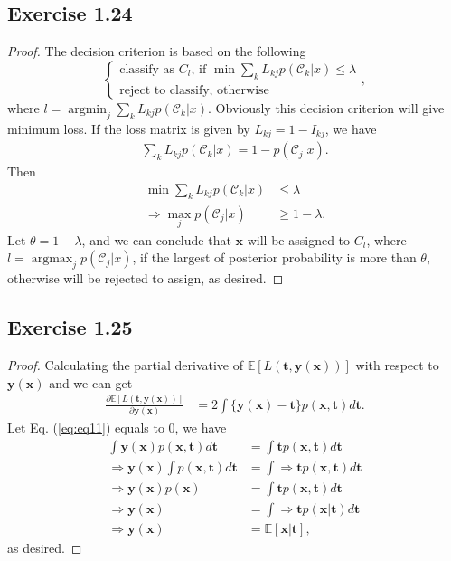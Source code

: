 \documentclass[11pt]{article}
\theoremstyle{definition}
\newcommand{\E}{\mathbb{E}}
\begin{document}
\subsection{Exercise 1.24}
\begin{proof}
The decision criterion is based on the following
$$\left\{\begin{array}{l}
\text{classify as } C_l \text{, if $\mathop{\min}\sum_k  L_{kj}p(\mathcal{C}_k|x)$} \leq \lambda\\ 
\text{reject to classify, otherwise}
\end{array}\right.,$$
where $l = \mathop{\arg\min}_j\sum_k  L_{kj}p(\mathcal{C}_k|x)$. Obviously this decision criterion will give minimum loss. If the loss matrix is given by $L_{kj} = 1 - I_{kj}$, we have
\begin{align*}
\sum_kL_{kj}p(\mathcal{C}_k|x) = 1 - p(\mathcal{C}_j|x).
\end{align*}
Then
\begin{align*}
\mathop{\min}\sum_k  L_{kj}p(\mathcal{C}_k|x) &\leq \lambda \\
\Rightarrow\mathop{\max}_j p(\mathcal{C}_j|x) &\geq 1 -\lambda.
\end{align*}
Let $\theta = 1 - \lambda$, and we can conclude that $\textbf{x}$ will be assigned to $C_l$, where $l = \mathop{\arg\max}_jp(\mathcal{C}_j|x)$, if the largest of posterior probability is more than $\theta$, otherwise will be rejected to assign, as desired.
\end{proof}

\subsection{Exercise 1.25}
\begin{proof}
Calculating the partial derivative of $\E[L(\textbf{t},\textbf{y}(\textbf{x}))]$ with respect to $\textbf{y}(\textbf{x})$ and we can get 
\begin{align}
\frac{\partial \E[L(\textbf{t},\textbf{y}(\textbf{x}))]}{\partial \textbf{y}(\textbf{x})} &= 2\int \{\textbf{y}(\textbf{x})-\textbf{t}\}p(\textbf{x},\textbf{t})d\textbf{t}.
\label{eq:eq11}
\end{align}
Let Eq. (\ref{eq:eq11}) equals to 0, we have
\begin{align*}
\int \textbf{y}(\textbf{x})p(\textbf{x},\textbf{t})d\textbf{t} &= \int \textbf{t}p(\textbf{x},\textbf{t})d\textbf{t} \\
\Rightarrow\textbf{y}(\textbf{x})\int p(\textbf{x},\textbf{t})d\textbf{t} &= \int \Rightarrow\textbf{t}p(\textbf{x},\textbf{t})d\textbf{t} \\
\Rightarrow\textbf{y}(\textbf{x})p(\textbf{x}) &= \int \textbf{t}p(\textbf{x},\textbf{t})d\textbf{t} \\
\Rightarrow\textbf{y}(\textbf{x}) &= \int \Rightarrow\textbf{t}p(\textbf{x}|\textbf{t})d\textbf{t} \\
\Rightarrow\textbf{y}(\textbf{x}) &= \E[\textbf{x}|\textbf{t}],
\end{align*}
as desired.
\end{proof}
\end{document}
